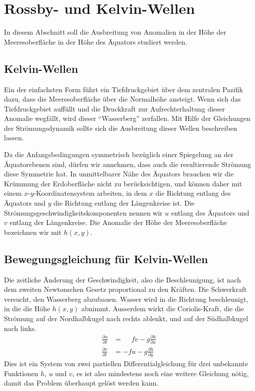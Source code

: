 %
%
%
\section{Rossby- und Kelvin-Wellen\label{section:elnino:kelvinrossby}}
In diesem Abschnitt soll die Ausbreitung von Anomalien in der Höhe
der Meeresoberfläche in der Höhe des Äquators studiert werden.

\subsection{Kelvin-Wellen\label{subsection:kelvin}}
Ein der einfachsten Form führt ein Tiefdruckgebiet über dem zentralen
Pazifik dazu, dass die Meeresoberfläche über die Normalhöhe ansteigt.
Wenn sich das Tiefdruckgebiet auffüllt und die Druckkraft zur Aufrechterhaltung
dieser Anomalie wegfällt, wird dieser ``Wasserberg'' zerfallen.
Mit Hilfe der Gleichungen der Strömungsdynamik sollte sich die Ausbreitung
dieser Wellen beschreiben lassen.

Da die Anfangsbedingungen symmetrisch bezüglich einer Spiegelung an
der Äquatorebenen sind, dürfen wir annehmen, dass auch die resultierende
Strömung diese Symmetrie hat.
In unmittelbarer Nähe des Äquators brauchen wir die Krümmung der
Erdoberfläche nicht zu berücksichtigen, und können daher mit einem
$x$-$y$-Koordinatensystem arbeiten, in dem $x$ die Richtung entlang des
Äquators und $y$ die Richtung entlang der Längenkreise ist.
Die Strömungsgeschwindigkeitskomponenten nennen wir $u$ entlang des
Äquators und $v$ entlang der Längenkreise.
Die Anomalie der Höhe der Meeresoberfläche bezeichnen wir mit $h(x,y)$.

\subsection{Bewegungsgleichung für Kelvin-Wellen}
Die zeitliche Änderung der Geschwindigkeit, also die Beschleunigung,
ist nach dem zweiten Newtonschen Gesetz proportional zu den Kräften.
Die Schwerkraft versucht, den Wasserberg abzubauen.
Wasser wird in die Richtung beschleunigt, in die die Höhe $h(x,y)$
abnimmt.
Ausserdem wirkt die Coriolis-Kraft, die die Strömung auf der Nordhalbkugel
nach rechts ablenkt, und auf der Südhalbkugel nach links.
\begin{equation}
\begin{aligned}
\frac{\partial u}{\partial t}
&=
\phantom{-}
fv - g\frac{\partial h}{\partial x}
\\
\frac{\partial v}{\partial t}
&=
-fu - g\frac{\partial h}{\partial y}
\end{aligned}
\label{elnino:kelvin:newton}
\end{equation}
Dies ist ein System von zwei partiellen Differentialgleichung für 
drei unbekannte Funktionen $h$, $u$ und $v$, es ist also mindestens
noch eine weitere Gleichung nötig, damit das Problem überhaupt gelöst
werden kann.

